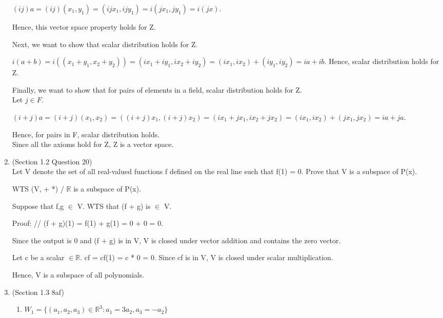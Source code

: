 \documentclass[12pt]{article}
\begin{document}
\begin{enumerate}
        $(ij)a = (ij)(x_1, y_1) = (ijx_1, ijy_1) = i(jx_1, jy_1) = i(jx)$.

        Hence, this vector space property holds for Z. 

        Next, we want to show that scalar distribution holds for Z. 

        $i(a + b) = i((x_1 + y_1, x_2 + y_2)) = (ix_1 + iy_1, ix_2 + iy_2) = (ix_1, ix_2) + (iy_1, iy_2) = ia + ib$.
        Hence, scalar distribution holds for Z. 

        Finally, we want to show that for pairs of elements in a field, scalar distribution holds for Z. \\

        Let $j \in F$. 

        $(i + j)a = (i + j)(x_1, x_2) = ((i + j)x_1, (i + j)x_2) = (ix_1 + jx_1, ix_2 + jx_2) = (ix_1, ix_2) + (jx_1, jx_2) = ia + ja$.

        Hence, for pairs in F, scalar distribution holds. \\

        Since all the axioms hold for Z, Z is a vector space. \qedsymbol{}
        
    
    \item (Section 1.2 Question 20) \\
        Let V denote the set of all real-valued functions f defined on the real line such that f(1) = 0. Prove that V is a subspace of P(x). 

        WTS (V, + *) / $\mathbb{R}$ is a subspace of P(x). 

        Suppose that f,g $\in$ V. 
        WTS that (f + g) is $\in$ V. 

        Proof: //
        (f + g)(1) = f(1) + g(1) = 0 + 0 = 0. 

        Since the output is 0 and (f + g) is in V, V is closed under vector addition and contains the zero vector. 

        Let c be a scalar $\in \mathbb{R}.$ 
        cf = cf(1) = c * 0 = 0.
        Since cf is in V, V is closed under scalar multiplication.

        Hence, V is a subspace of all polynomials. \qedsymbol{}
        
    \item (Section 1.3 8af) 
    \begin{enumerate}[label=(\alph*)]
        \item $W_1 = \{(a_1, a_2, a_3) \in \mathbb{R}^3 : a_1 = 3a_2, a_3 = -a_2\}$


\end{enumerate}
\end{enumerate}
\end{document}
